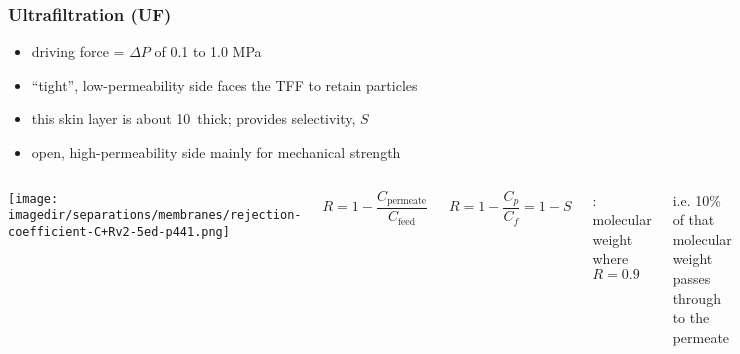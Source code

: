 \begin{frame}\frametitle{Ultrafiltration (UF)}

	\begin{itemize}
		\item	driving force = $\Delta P$ of 0.1 to 1.0 MPa %
		\item	``tight'', low-permeability side faces the TFF to retain particles
		\item	this skin layer is about 10\micron\, thick; provides {\color{purple}selectivity}, $S$
		\item	open, high-permeability side mainly for mechanical strength %
	\end{itemize}

	\begin{columns}[t]
			\vspace{-12pt}
			\begin{center}
				\texttt{[image: \\imagedir/separations/membranes/rejection-coefficient-C+Rv2-5ed-p441.png]}
			\end{center}
			\vspace{-12pt}

			$R = 1 -\dfrac{C_\text{permeate}}{C_\text{feed}}$

			$R = 1- \dfrac{C_p}{C_f} = 1 -S$

			\vspace{12pt}
			{\color{purple}{MWCO}}: molecular weight where $R=0.9$

			\vspace{12pt}
			i.e. 10\% of that molecular weight passes through to the permeate
	\end{columns}
\end{frame}

